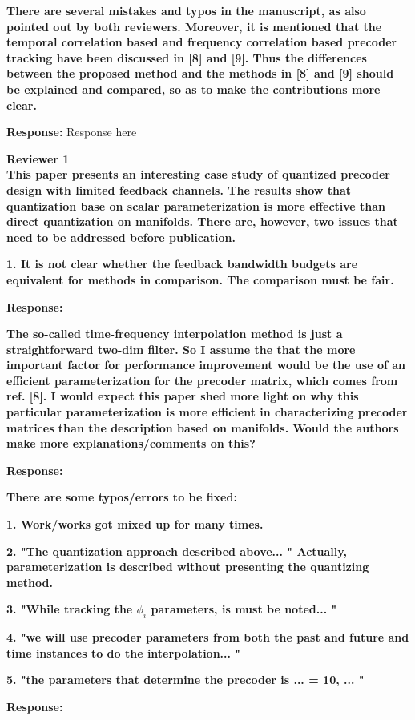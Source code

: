 \documentclass[12pt]{letter}
\begin{document}
\textbf{There are several mistakes and typos in the manuscript, as
  also pointed out by both reviewers. Moreover, it is mentioned that
  the temporal correlation based and frequency correlation based
  precoder tracking have been discussed in [8] and [9]. Thus the
  differences between the proposed method and the methods in [8] and
  [9] should be explained and compared, so as to make the
  contributions more clear.}

\textbf{Response:} Response here

\textbf{Reviewer 1}\\

\textbf{This paper presents an interesting case study of quantized
  precoder design with limited feedback channels. The results show
  that quantization base on scalar parameterization is more effective
  than direct quantization on manifolds. There are, however, two
  issues that need to be addressed before publication.}

\textbf{1. It is not clear whether the feedback bandwidth budgets are
equivalent for methods in comparison. The comparison must be fair.}

\textbf{Response:}

\textbf{ The so-called time-frequency interpolation method is just a
  straightforward two-dim filter. So I assume the that the more
  important factor for performance improvement would be the use of an
  efficient parameterization for the precoder matrix, which comes from
  ref. [8]. I would expect this paper shed more light on why this
  particular parameterization is more efficient in characterizing
  precoder matrices than the description based on manifolds.  Would
  the authors make more explanations/comments on this?}

\textbf{Response:}

\textbf{There are some typos/errors to be fixed:}

\textbf{1. Work/works got mixed up for many times.}

\textbf{2. "The quantization approach described above... " Actually,
  parameterization is described without presenting the quantizing
  method.}

\textbf{3. "While tracking the $\phi_i$ parameters, is must be noted... "}

\textbf{4. "we will use precoder parameters from both the past and future and
time instances to do the interpolation... "}

\textbf{5. "the parameters that determine the precoder is ...  = 10, ... "}

\textbf{Response:}
\end{document}
